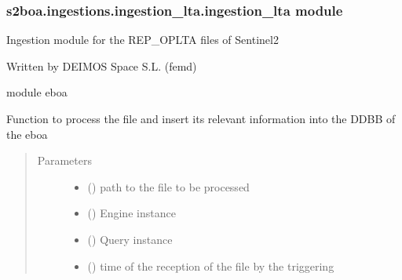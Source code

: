 \subsubsection{s2boa.ingestions.ingestion\_lta.ingestion\_lta module}
\label{\detokenize{s2boa.ingestions:module-s2boa.ingestions.ingestion_lta.ingestion_lta}}\label{\detokenize{s2boa.ingestions:s2boa-ingestions-ingestion-lta-ingestion-lta-module}}
\sphinxAtStartPar
Ingestion module for the REP\_OPLTA files of Sentinel\sphinxhyphen{}2

\sphinxAtStartPar
Written by DEIMOS Space S.L. (femd)

\sphinxAtStartPar
module eboa

\begin{fulllineitems}
\label{\detokenize{s2boa.ingestions:s2boa.ingestions.ingestion_lta.ingestion_lta.process_file}}
\sphinxAtStartPar
Function to process the file and insert its relevant information
into the DDBB of the eboa
\begin{quote}\begin{description}
\item[{Parameters}] \leavevmode\begin{itemize}
\item {} 
\sphinxAtStartPar
{} () \textendash{} path to the file to be processed

\item {} 
\sphinxAtStartPar
{} () \textendash{} Engine instance

\item {} 
\sphinxAtStartPar
{} () \textendash{} Query instance

\item {} 
\sphinxAtStartPar
{} () \textendash{} time of the reception of the file by the triggering

\end{itemize}

\end{description}\end{quote}

\end{fulllineitems}



